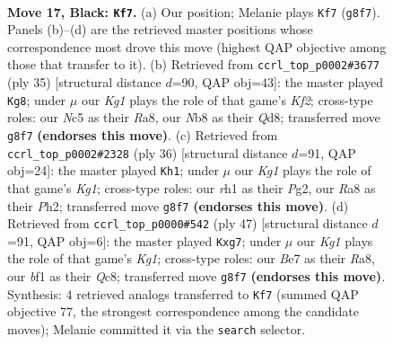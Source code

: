 \documentclass[11pt]{article}
\begin{document}
\begin{figure}[p]
\label{fig:thought-m31}
\end{figure}

\clearpage

\begin{figure}[p]\centering
\begin{subfigure}{0.46\textwidth}\centering
\resizebox{\linewidth}{!}{%
\newchessgame
\chessboard[
  setfen={rnbq1rkQ/p3b3/1p4p1/2np2P1/P7/2N2N2/1P3P2/R1B1KB1R b KQ - 1 17},
  showmover=false,
  pgfstyle=straightmove, color=movearrow, markmove={g8-f7}
]}
\caption{}
\end{subfigure}\hfill
\begin{subfigure}{0.46\textwidth}\centering
\resizebox{\linewidth}{!}{%
\newchessgame
\chessboard[
  setfen={r2q1r2/1pp1bkpp/8/3pNb2/N2Pn3/1Q6/P4PPP/R1B1R1K1 b - - 3 18},
  showmover=false,
  pgfstyle=straightmove, color=movearrow, markmove={f7-g8}
]}
\caption{}
\end{subfigure}
\\[4pt]
\begin{subfigure}{0.46\textwidth}\centering
\resizebox{\linewidth}{!}{%
\newchessgame
\chessboard[
  setfen={b4rk1/5p2/1q1p1bpp/1N2n3/4P3/1N6/1PP1B1PP/3Q1RK1 w - - 1 19},
  showmover=false,
  pgfstyle=straightmove, color=movearrow, markmove={g1-h1}
]}
\caption{}
\end{subfigure}\hfill
\begin{subfigure}{0.46\textwidth}\centering
\resizebox{\linewidth}{!}{%
\newchessgame
\chessboard[
  setfen={r1q2rk1/1p2ppB1/p1b3p1/1n6/1P2N3/4Q1PP/5PBK/1R1R4 b - - 0 24},
  showmover=false,
  pgfstyle=straightmove, color=movearrow, markmove={g8-g7}
]}
\caption{}
\end{subfigure}
\caption{\textbf{Move 17, Black: \texttt{Kf7}.} (a) Our position; Melanie plays \texttt{Kf7} (\texttt{g8f7}). Panels (b)--(d) are the retrieved master positions whose correspondence most drove this move (highest QAP objective among those that transfer to it). (b) Retrieved from \texttt{ccrl\_top\_p0002\#3677} (ply 35) [structural distance $d$=90, QAP obj=43]: the master played \texttt{Kg8}; under $\mu$ our \emph{Kg1} plays the role of that game's \emph{Kf2}; cross-type roles: our \emph{N}c5 as their \emph{R}a8, our \emph{N}b8 as their \emph{Q}d8; transferred move \texttt{g8f7} \textbf{(endorses this move)}. (c) Retrieved from \texttt{ccrl\_top\_p0002\#2328} (ply 36) [structural distance $d$=91, QAP obj=24]: the master played \texttt{Kh1}; under $\mu$ our \emph{Kg1} plays the role of that game's \emph{Kg1}; cross-type roles: our \emph{r}h1 as their \emph{P}g2, our \emph{R}a8 as their \emph{P}h2; transferred move \texttt{g8f7} \textbf{(endorses this move)}. (d) Retrieved from \texttt{ccrl\_top\_p0000\#542} (ply 47) [structural distance $d$=91, QAP obj=6]: the master played \texttt{Kxg7}; under $\mu$ our \emph{Kg1} plays the role of that game's \emph{Kg1}; cross-type roles: our \emph{B}e7 as their \emph{R}a8, our \emph{b}f1 as their \emph{Q}c8; transferred move \texttt{g8f7} \textbf{(endorses this move)}. Synthesis: 4 retrieved analogs transferred to \texttt{Kf7} (summed QAP objective 77, the strongest correspondence among the candidate moves); Melanie committed it via the \texttt{search} selector.}
\label{fig:thought-m33}
\end{figure}
\end{document}
